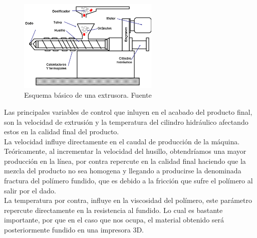 \begin{figure}[H]
        \centering
        \includegraphics[width=0.6\textwidth]{images/extrusor.png}
        \caption{Esquema básico de una extrusora. Fuente \cite{disenoextrusor}}
        \label{fig:estado_extrusora}
\end{figure}

Las principales variables de control que inluyen en el acabado del producto final, son la velocidad de extrusión y la temperatura del cilindro hidráulico afectando estos en la calidad final del producto.\\

La velocidad influye directamente en el caudal de producción de la máquina. Teóricamente, al incrementar la velocidad del husillo, obtendríamos una mayor producción en la línea, por contra repercute en la calidad final haciendo que la mezcla del producto no sea homogena y llegando a producirse la denominada fractura del polímero fundido, que es debido a la fricción que sufre el polímero al salir por el dado.\\

La temperatura por contra, influye en la viscosidad del polímero, este parámetro repercute directamente en la resistencia al fundido. Lo cual es bastante importante, por que en el caso que nos ocupa, el  material obtenido será posteriormente fundido en una impresora 3D.\\

